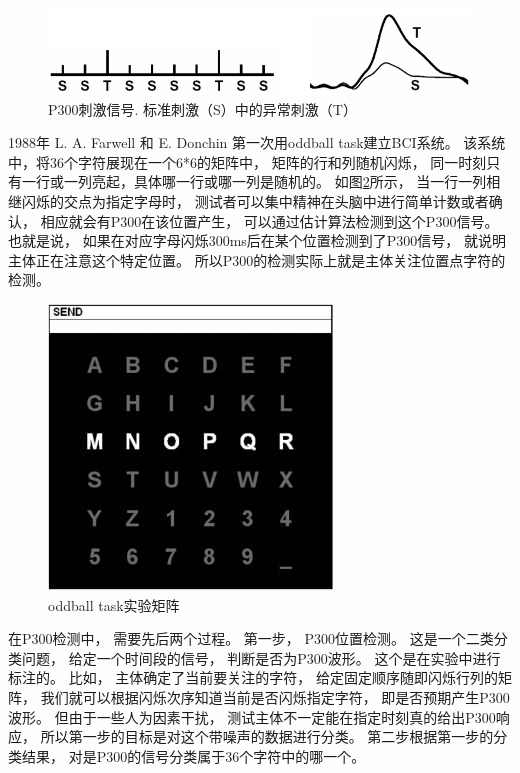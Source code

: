 \begin{figure}[htb]
\centering
\includegraphics[scale=0.6]{Pictures/Chap1/p300_example.png}
\caption{P300刺激信号. 标准刺激（S）中的异常刺激（T）}
\label{Fig:P300_brief}
\end{figure}


1988年 L. A. Farwell 和 E. Donchin 第一次用oddball task建立BCI系统\cite{farwell1988talking}。 该系统中，将36个字符展现在一个6*6的矩阵中， 矩阵的行和列随机闪烁， 同一时刻只有一行或一列亮起，具体哪一行或哪一列是随机的。 如图\ref{Fig:p300matrix}所示\cite{cecotti2011convolutional}， 当一行一列相继闪烁的交点为指定字母时， 测试者可以集中精神在头脑中进行简单计数或者确认， 相应就会有P300在该位置产生， 可以通过估计算法检测到这个P300信号。 也就是说， 如果在对应字母闪烁300ms后在某个位置检测到了P300信号， 就说明主体正在注意这个特定位置。 所以P300的检测实际上就是主体关注位置点字符的检测。  

\begin{figure}[htb]
\centering
\includegraphics[scale=0.8]{Pictures/Chap1/p300_matrix.jpg}
\caption{oddball task实验矩阵}
\label{Fig:p300matrix}
\end{figure}

在P300检测中， 需要先后两个过程。 第一步， P300位置检测。 这是一个二类分类问题， 给定一个时间段的信号， 判断是否为P300波形。 这个是在实验中进行标注的。 比如， 主体确定了当前要关注的字符， 给定固定顺序随即闪烁行列的矩阵， 我们就可以根据闪烁次序知道当前是否闪烁指定字符， 即是否预期产生P300波形。 但由于一些人为因素干扰， 测试主体不一定能在指定时刻真的给出P300响应， 所以第一步的目标是对这个带噪声的数据进行分类。 第二步根据第一步的分类结果， 对是P300的信号分类属于36个字符中的哪一个。




